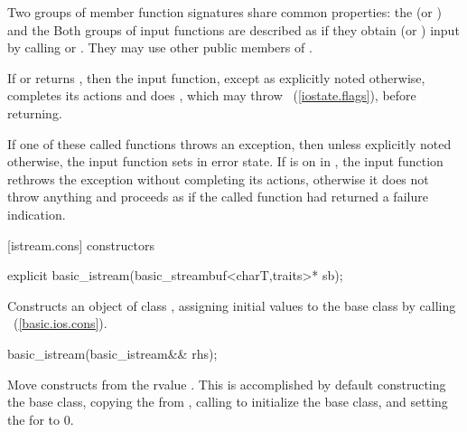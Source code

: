 \pnum
Two groups of member function signatures share common properties:
the
(or
)
and the
Both groups of input functions are described as if they obtain (or
)
input
by calling
or
.
They may use other public members of
.

\pnum
If
or
returns
,
then the input function, except as explicitly noted otherwise, completes its actions and does
,
which may throw
~(\ref{iostate.flags}), before returning.

\pnum
If one of these called functions throws an exception, then unless explicitly noted otherwise,
the input function sets
in error state.
If
is on in
,
the input function
rethrows the exception without completing its actions, otherwise
it does not throw anything and proceeds as if the called function had returned
a failure indication.

[istream.cons]{ constructors}

%
\begin{itemdecl}
explicit basic_istream(basic_streambuf<charT,traits>* sb);
\end{itemdecl}

%
\begin{itemdescr}
\pnum
\effects
Constructs an object of class
,
assigning initial values to the base class by calling
~(\ref{basic.ios.cons}).

\pnum
\postcondition
{}
\end{itemdescr}


%
\begin{itemdecl}
basic_istream(basic_istream&& rhs);
\end{itemdecl}

\begin{itemdescr}
\pnum
\effects Move constructs from the rvalue .
This is accomplished by default constructing the base class, copying the
 from , calling
 to initialize the base
class, and setting the  for  to 0.
\end{itemdescr}

